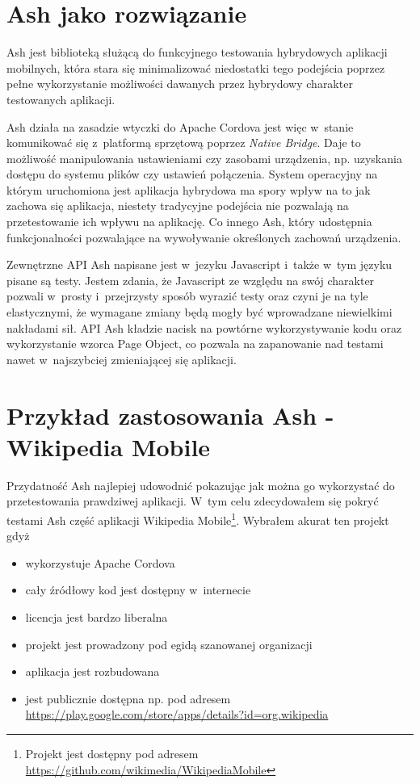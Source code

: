 \documentclass[brudnopis]{xmgr}
\begin{document}
                                                                                                                                                                 
\section{Ash jako rozwiązanie}

Ash jest biblioteką służącą do funkcyjnego testowania hybrydowych aplikacji mobilnych, która stara się minimalizować niedostatki tego podejścia poprzez pełne wykorzystanie możliwości dawanych przez hybrydowy charakter testowanych aplikacji. 

Ash działa na zasadzie wtyczki do Apache Cordova jest więc w~stanie komunikować się z~platformą sprzętową poprzez \textit{Native Bridge}. Daje to możliwość manipulowania ustawieniami czy zasobami urządzenia, np. uzyskania dostępu do systemu plików czy ustawień połączenia. System operacyjny na którym uruchomiona jest aplikacja hybrydowa ma spory wpływ na to jak zachowa się aplikacja, niestety tradycyjne podejścia nie pozwalają na przetestowanie ich wpływu na aplikację. Co innego Ash, który udostępnia funkcjonalności pozwalające na wywoływanie określonych zachowań urządzenia. 

Zewnętrzne API Ash napisane jest w~jezyku Javascript i~także w~tym języku pisane są testy. Jestem zdania, że Javascript ze względu na swój charakter pozwali w~prosty i~przejrzysty sposób wyrazić testy oraz czyni je na tyle elastycznymi, że wymagane zmiany będą mogły być wprowadzane niewielkimi nakładami sił. API Ash kładzie nacisk na powtórne wykorzystywanie kodu oraz wykorzystanie wzorca Page Object, co pozwala na zapanowanie nad testami nawet w~najszybciej zmieniającej się aplikacji. 

\section{Przykład zastosowania Ash - Wikipedia Mobile}

Przydatność Ash najlepiej udowodnić pokazując jak można go wykorzystać do przetestowania prawdziwej aplikacji. W~tym celu zdecydowałem się pokryć testami Ash część aplikacji Wikipedia Mobile\footnote{Projekt jest dostępny pod adresem \url{https://github.com/wikimedia/WikipediaMobile} }. Wybrałem akurat ten projekt gdyż

\begin{itemize}
  \item wykorzystuje Apache Cordova
  \item cały źródłowy kod jest dostępny w~internecie
  \item licencja jest bardzo liberalna
  \item projekt jest prowadzony pod egidą szanowanej organizacji
  \item aplikacja jest rozbudowana
  \item jest publicznie dostępna np. pod adresem \url{https://play.google.com/store/apps/details?id=org.wikipedia}
\end{itemize}
\end{document}
